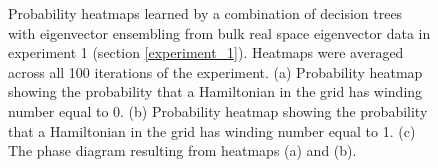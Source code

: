 \documentclass[10pt]{revtex4-1}
\begin{document}
\begin{figure}
\centering
{}
\caption{Probability heatmaps learned by a combination of decision trees with eigenvector ensembling from bulk real space eigenvector data in experiment 1 (section \ref{experiment_1}). Heatmaps were averaged across all 100 iterations of the experiment. (a) Probability heatmap showing the probability that a Hamiltonian in the grid has winding number equal to 0.  (b) Probability heatmap showing the probability that a Hamiltonian in the grid has winding number equal to 1. (c) The phase diagram resulting from heatmaps (a) and (b).}
\label{ssh1_heatmaps}
\end{figure}
\end{document}
